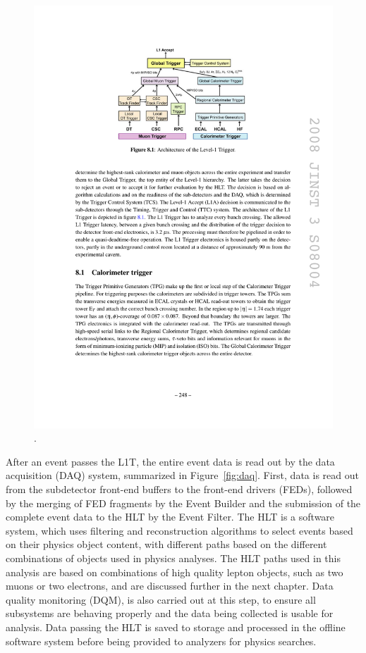 \begin{figure}[tbh]
\centering
\includegraphics[width=5in]{figures/l1t.pdf}
\caption{.}
\label{fig:l1t}
\end{figure}

\indent After an event passes the L1T, the entire event data is read out by the data acquisition (DAQ) system, summarized in Figure~\ref{fig:daq}. First, data is read out from the subdetector front-end buffers to the front-end drivers (FEDs), followed by the merging of FED fragments by the Event Builder and the submission of the complete event data to the HLT by the Event Filter. The HLT is a software system, which uses filtering and reconstruction algorithms to select events based on their physics object content, with different paths based on the different combinations of objects used in physics analyses. The HLT paths used in this analysis are based on combinations of high quality lepton objects, such as two muons or two electrons, and are discussed further in the next chapter. Data quality monitoring (DQM), is also carried out at this step, to ensure all subsystems are behaving properly and the data being collected is usable for analysis. Data passing the HLT is saved to storage and processed in the offline software system before being provided to analyzers for physics searches. 

